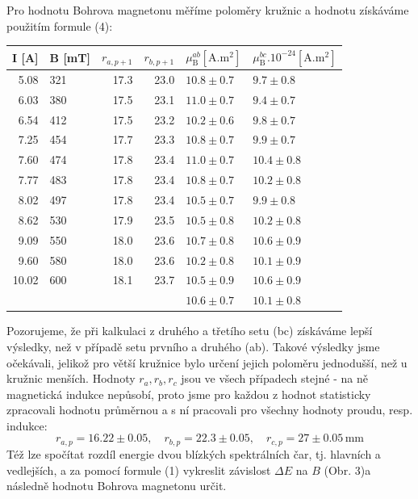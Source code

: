 \documentclass[czech,11pt,a4paper]{article}
\begin{document}
\begin{multicols}{2}
		Pro hodnotu Bohrova magnetonu měříme poloměry kružnic a hodnotu získáváme použitím formule (4):\\
{\small 	\begin{tabular}{rlrr|ll}

	
		I [A] & B [mT] & $r_{a, p+1}$ &$ r_{b,p+1}$ & $\mu _\mathrm{B}^{ab}\mathrm{[A.m^2]}$ &$ \mu _\mathrm{B}^{bc} .10^{-24} \mathrm{[A.m^2]}$\\ \hline
		5.08 & 321 & 17.3 & 23.0 &$ 10.8\pm0.7 $&$ 9.7\pm0.8 $\\
		6.03 & 380 & 17.5 & 23.1 & $11.0\pm0.7 $&$ 9.4\pm0.7 $\\
		6.54 & 412 & 17.5 & 23.2 &$ 10.2\pm0.6 $&$ 9.8\pm0.7 $\\
		7.25 & 454 & 17.7 & 23.3 &$ 10.8\pm0.7 $&$ 9.9\pm0.7 $\\
		7.60 & 474 & 17.8 & 23.4 &$ 11.0\pm0.7 $&$ 10.4\pm0.8 $\\
		7.77 & 483 & 17.8 & 23.4 &$ 10.8\pm0.7 $&$ 10.2\pm0.8 $\\
		8.02 & 497 & 17.8 & 23.4 &$ 10.5\pm0.7 $&$ 9.9\pm0.8 $\\
		8.62 & 530 & 17.9 & 23.5 &$ 10.5\pm0.8 $&$ 10.2\pm0.8 $\\
		9.09 & 550 & 18.0 & 23.6 &$ 10.7\pm0.8 $&$ 10.6\pm0.9 $\\
		9.60 & 580 & 18.0 & 23.6 &$ 10.2\pm0.8 $&$ 10.1\pm0.9 $\\
		10.02 & 600 & 18.1 & 23.7 &$ 10.5\pm0.9 $&$ 10.6\pm0.9$ \\\hline \hline
			&		&		&	&$10.6 \pm 0.7$&$10.1\pm 0.8$\\
			

	\end{tabular}}
		Pozorujeme, že při kalkulaci z druhého a třetího setu (bc) získáváme lepší výsledky, než v případě setu prvního a druhého (ab). Takové výsledky jsme očekávali, jelikož pro větší kružnice bylo určení jejich poloměru jednodušší, než u kružnic menších. Hodnoty $r_a, r_b, r_c$ jsou ve všech případech stejné - na ně magnetická indukce nepůsobí, proto jsme pro každou z hodnot statisticky zpracovali hodnotu průměrnou a s ní pracovali pro všechny hodnoty proudu, resp. indukce:
		\begin{equation*}
			r_{a,p} = 16.22 \pm 0.05, \quad r_{b,p} = 22.3 \pm 0.05, \quad r_{c,p} = 27 \pm 0.05 \,\mathrm{mm}
		\end{equation*}
		Též lze spočítat rozdíl energie dvou blízkých spektrálních čar, tj. hlavních a vedlejších, a za pomocí formule (1) vykreslit závislost $\Delta E$ na $B$ (Obr. 3)a následně hodnotu Bohrova magnetonu určit.
		

\end{multicols}
\end{document}

